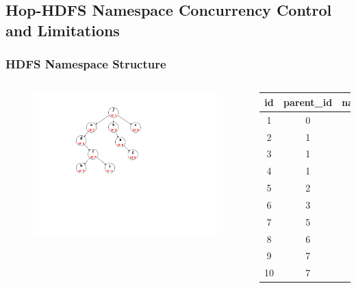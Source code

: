 \documentclass{beamer}
\begin{document}
\subsection{Hop-HDFS Namespace Concurrency Control and Limitations}
\begin{frame}
	\frametitle{HDFS Namespace Structure}
	\begin{columns}[c] %
	
		\begin{figure}[h]
			\centering
			\includegraphics[scale=0.6]{figs/hoptree.pdf}
		\end{figure}
	
	\begin{table}[h]
		\centering
		\begin{tabular}{|c|c|c|}
			\hline
			\textbf{id} & \textbf{parent\_id} & \textbf{name}\\ \hline
			1 & 0 & / \\ \hline
			2 & 1 & a \\ \hline
			3 & 1 & b \\ \hline
			4 & 1 & c \\ \hline
			5 & 2 & d \\ \hline
			6 & 3 & e \\ \hline
			7 & 5 & f \\ \hline
			8 & 6 & g \\ \hline
			9 & 7 & h \\ \hline
			10 & 7 & i \\ \hline
		\end{tabular}
	\end{table}
	
	\end{columns}
\end{frame}
\end{document}
